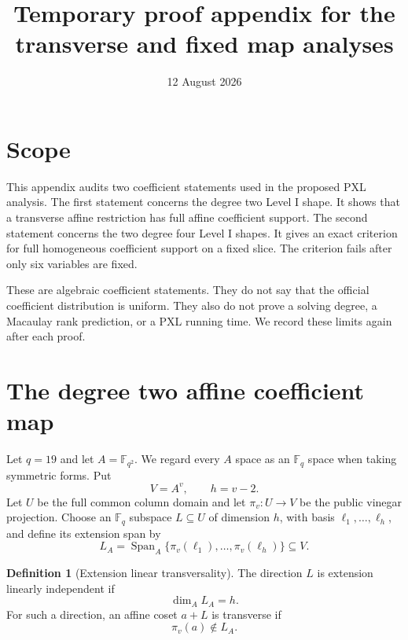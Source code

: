 \documentclass[11pt]{article}
\title{Temporary proof appendix for the transverse and fixed map analyses}
\author{}
\date{12 August 2026}
\newcommand{\F}{\mathbb F}
\newcommand{\Span}{\operatorname{Span}}
\theoremstyle{plain}
\theoremstyle{definition}
\newtheorem{definition}[theorem]{Definition}
\theoremstyle{remark}
\begin{document}
\maketitle

\begin{center}
\end{center}

\section{Scope}

This appendix audits two coefficient statements used in the proposed PXL
analysis.  The first statement concerns the degree two Level I shape.  It
shows that a transverse affine restriction has full affine coefficient
support.  The second statement concerns the two degree four Level I shapes.
It gives an exact criterion for full homogeneous coefficient support on a
fixed slice.  The criterion fails after only six variables are fixed.

These are algebraic coefficient statements.  They do not say that the
official coefficient distribution is uniform.  They also do not prove a
solving degree, a Macaulay rank prediction, or a PXL running time.  We record
these limits again after each proof.

\section{The degree two affine coefficient map}
\label{sec:l2}

Let $q=19$ and let $A=\F_{q^2}$.  We regard every $A$ space as an
$\F_q$ space when taking symmetric forms.  Put
\[
  V=A^v,
  \qquad h=v-2.
\]
Let $U$ be the full common column domain and let
$\pi_v:U\to V$ be the public vinegar projection.  Choose an
$\F_q$ subspace $L\subseteq U$ of dimension $h$, with basis
$\ell_1,\ldots,\ell_h$, and define its extension span by
\[
  L_A=\Span_A\{\pi_v(\ell_1),\ldots,\pi_v(\ell_h)\}
  \subseteq V.
\]

\begin{definition}[Extension linear transversality]
\label{def:l2-transverse}
The direction $L$ is extension linearly independent if
\[
  \dim_A L_A=h.
\]
For such a direction, an affine coset $a+L$ is transverse if
\[
  \pi_v(a)\notin L_A.
\]
\end{definition}
\end{document}
